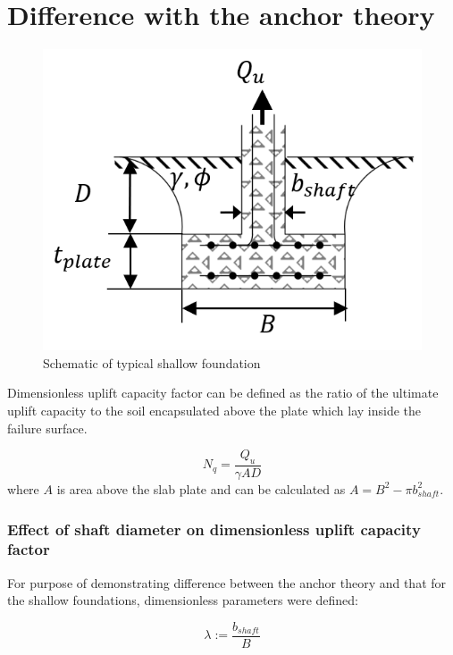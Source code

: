 \documentclass[a4paper, nobind]{templates/ociamthesis}
\begin{document}
\hypertarget{difference-with-the-anchor-theory}{%
\section{Difference with the anchor theory}\label{difference-with-the-anchor-theory}}

\begin{figure}[H]

{\centering \includegraphics[width=0.7\linewidth]{myfigureeeeee/foundation_drawing1} 

}

\caption{Schematic of typical shallow foundation}\label{fig:unnamed-chunk-49}
\end{figure}

Dimensionless uplift capacity factor can be defined as the ratio of the ultimate uplift capacity to the soil encapsulated above the plate which lay inside the failure surface.

\[
N_q = \frac{Q_u}{\gamma AD}
\]
where \(A\) is area above the slab plate and can be calculated as \(A=B^2 - \pi b_{shaft}^2\).

\hypertarget{effect-of-shaft-diameter-on-dimensionless-uplift-capacity-factor}{%
\subsubsection{Effect of shaft diameter on dimensionless uplift capacity factor}\label{effect-of-shaft-diameter-on-dimensionless-uplift-capacity-factor}}

For purpose of demonstrating difference between the anchor theory and that for the shallow foundations, dimensionless parameters were defined:

\[
\lambda := \frac{b_{shaft}}{B}
\]
\end{document}
